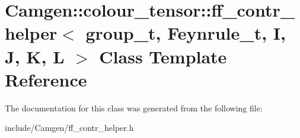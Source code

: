 \hypertarget{a00228}{}\section{Camgen\+:\+:colour\+\_\+tensor\+:\+:ff\+\_\+contr\+\_\+helper$<$ group\+\_\+t, Feynrule\+\_\+t, I, J, K, L $>$ Class Template Reference}
\label{a00228}


The documentation for this class was generated from the following file\+:\begin{DoxyCompactItemize}
\item 
include/\+Camgen/ff\+\_\+contr\+\_\+helper.\+h\end{DoxyCompactItemize}
